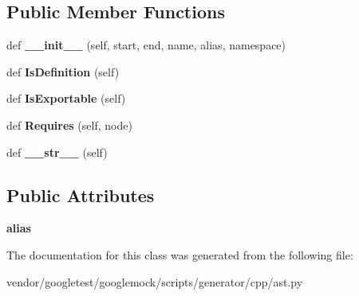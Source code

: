 \subsection*{Public Member Functions}
\begin{DoxyCompactItemize}
\item 
def {\bfseries \+\_\+\+\_\+init\+\_\+\+\_\+} (self, start, end, name, alias, namespace)\hypertarget{classcpp_1_1ast_1_1Typedef_af3275d2390190a074de470c1424e05e0}{}\label{classcpp_1_1ast_1_1Typedef_af3275d2390190a074de470c1424e05e0}

\item 
def {\bfseries Is\+Definition} (self)\hypertarget{classcpp_1_1ast_1_1Typedef_a103bf391e665884bfbfd20fc5e6d1a19}{}\label{classcpp_1_1ast_1_1Typedef_a103bf391e665884bfbfd20fc5e6d1a19}

\item 
def {\bfseries Is\+Exportable} (self)\hypertarget{classcpp_1_1ast_1_1Typedef_adee58e4674b049d8e4435b5b6ad8e1d4}{}\label{classcpp_1_1ast_1_1Typedef_adee58e4674b049d8e4435b5b6ad8e1d4}

\item 
def {\bfseries Requires} (self, node)\hypertarget{classcpp_1_1ast_1_1Typedef_aa9f65f4a97ba340f2c9ebc5e7ce27e8c}{}\label{classcpp_1_1ast_1_1Typedef_aa9f65f4a97ba340f2c9ebc5e7ce27e8c}

\item 
def {\bfseries \+\_\+\+\_\+str\+\_\+\+\_\+} (self)\hypertarget{classcpp_1_1ast_1_1Typedef_a451920900affc5f12e38ab8fbf5e3dea}{}\label{classcpp_1_1ast_1_1Typedef_a451920900affc5f12e38ab8fbf5e3dea}

\end{DoxyCompactItemize}
\subsection*{Public Attributes}
\begin{DoxyCompactItemize}
\item 
{\bfseries alias}\hypertarget{classcpp_1_1ast_1_1Typedef_a3187a504dfbefe50b866b44902823c30}{}\label{classcpp_1_1ast_1_1Typedef_a3187a504dfbefe50b866b44902823c30}

\end{DoxyCompactItemize}


The documentation for this class was generated from the following file\+:\begin{DoxyCompactItemize}
\item 
vendor/googletest/googlemock/scripts/generator/cpp/ast.\+py\end{DoxyCompactItemize}
